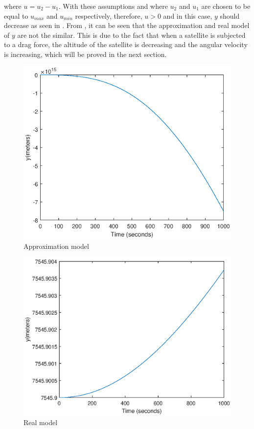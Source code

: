 where $u= u_2 - u_1$.
With these assumptions and where $u_2$ and $u_1$ are chosen to be equal to $u_{max}$ and $u_{min}$ respectively, therefore, $u>0$ and in this case, $y$ should decrease as seen in . From , it can be seen that the approximation and real model of $y$  are not the similar. This is due to the fact that when a satellite is subjected to a drag force, the altitude of the satellite is decreasing and the angular velocity is increasing, which will be proved in the next section.
\begin{table}[H]
	\begin{minipage}[b]{0.49\linewidth}
		\centering
		\begin{figure}[H]
			\centering
			\includegraphics[width=1\linewidth]{figures/pic2.eps}
			\caption{Approximation model}
			\label{fig:u1}
		\end{figure}
	\end{minipage}\hfill
	\begin{minipage}[b]{0.49\linewidth}
		\centering
		\begin{figure}[H]
			\centering
			\includegraphics[width=1\linewidth]{figures/pic1.eps}
			\caption{Real model}
			\label{fig:u2}
		\end{figure}
	\end{minipage}
\end{table}
